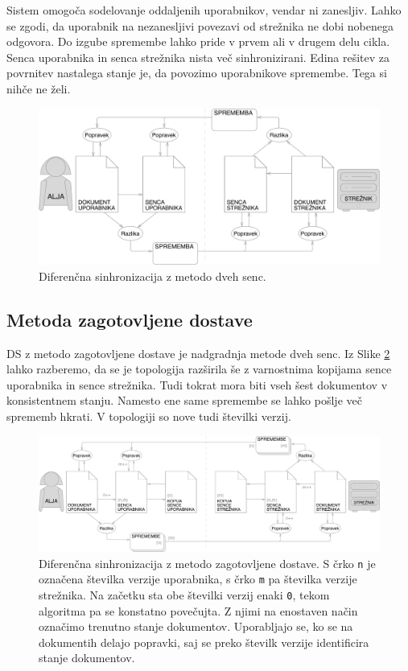 \documentclass[a4paper, 12pt, twoside]{book}
\begin{document}
Sistem omogoča sodelovanje oddaljenih uporabnikov, vendar ni zanesljiv. Lahko se zgodi, da uporabnik na nezanesljivi povezavi od strežnika ne dobi nobenega odgovora. Do izgube spremembe lahko pride v prvem ali v drugem delu cikla. Senca uporabnika in senca strežnika nista več sinhronizirani. Edina rešitev za povrnitev nastalega stanje je, da povozimo uporabnikove spremembe. Tega si nihče ne želi.

\begin{figure}[placement h]
\begin{center}
\includegraphics[width=11.83cm]{img/ds2.pdf}
\end{center}
\caption{Diferenčna sinhronizacija z metodo dveh senc.}
\label{ds2}
\end{figure}

\subsection{Metoda zagotovljene dostave}

DS z metodo zagotovljene dostave je nadgradnja metode dveh senc. Iz Slike \ref{ds3} lahko razberemo, da se je topologija razširila še z varnostnima kopijama sence uporabnika in sence strežnika. Tudi tokrat mora biti vseh šest dokumentov v konsistentnem stanju. Namesto ene same spremembe se lahko pošlje več sprememb hkrati. V topologiji so nove tudi številki verzij.

\begin{figure}[placement h]
\begin{center}
\includegraphics[width=16cm]{img/ds3.pdf}
\end{center}
\caption{Diferenčna sinhronizacija z metodo zagotovljene dostave. S črko {\tt n} je označena številka verzije uporabnika, s črko {\tt m} pa številka verzije strežnika. Na začetku sta obe številki verzij enaki {\tt 0}, tekom algoritma pa se konstatno povečujta. Z njimi na enostaven način označimo trenutno stanje dokumentov. Uporabljajo se, ko se na dokumentih delajo popravki, saj se preko številk verzije identificira stanje dokumentov.}
\label{ds3}
\end{figure}
\end{document}
